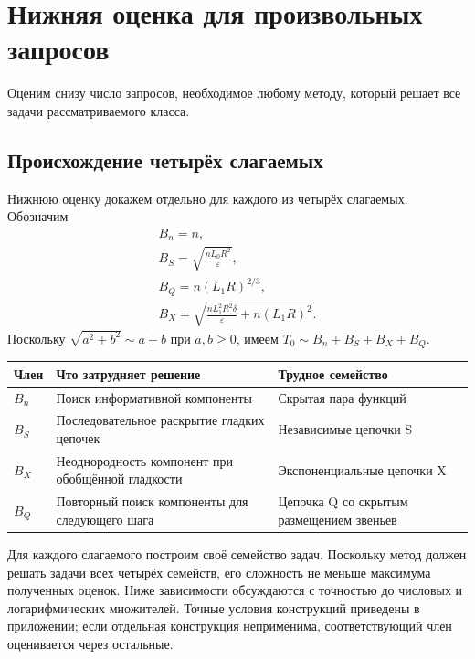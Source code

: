 \section{Нижняя оценка для произвольных запросов}\label{sec:lower}

Оценим снизу число запросов, необходимое любому методу,
который решает все задачи рассматриваемого класса.

\subsection{Происхождение четырёх слагаемых}\label{sec:lower-origin}

Нижнюю оценку докажем отдельно для каждого из четырёх слагаемых. Обозначим
\begin{equation}\label{eq:lower-four-terms}
 \begin{gathered}
 B_n=n,\\
 B_S=\sqrt{\frac{nL_0R^2}{\varepsilon}},\\
 B_Q=n(L_1R)^{2/3},\\
 B_X=\sqrt{\frac{nL_1^2R^2\delta}{\varepsilon}+n(L_1R)^2}.
 \end{gathered}
\end{equation}
Поскольку $\sqrt{a^2+b^2}\sim a+b$ при $a,b\ge0$, имеем
$T_0\sim B_n+B_S+B_X+B_Q$.

\begin{center}
\small
\renewcommand{\arraystretch}{1.18}
\begin{tabularx}{\linewidth}{@{}lYY@{}}
\toprule
Член & Что затрудняет решение & Трудное семейство\\
\midrule
$B_n$ & Поиск информативной компоненты & Скрытая пара функций\\
$B_S$ & Последовательное раскрытие гладких цепочек & Независимые цепочки S\\
$B_X$ & Неоднородность компонент при обобщённой гладкости & Экспоненциальные цепочки X\\
$B_Q$ & Повторный поиск компоненты для следующего шага & Цепочка Q со скрытым размещением звеньев\\
\bottomrule
\end{tabularx}
\end{center}

Для каждого слагаемого построим своё семейство задач.
Поскольку метод должен решать задачи всех четырёх семейств,
его сложность не меньше максимума полученных оценок.
Ниже зависимости обсуждаются с точностью до числовых и логарифмических
множителей. Точные условия конструкций приведены в приложении;
если отдельная конструкция неприменима, соответствующий член
оценивается через остальные.

